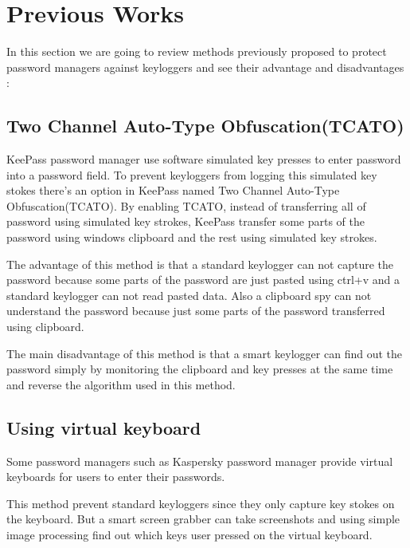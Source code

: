 \section{Previous Works}

In this section we are going to review methods previously proposed to protect password managers against keyloggers and see their advantage and disadvantages : 

\subsection{Two Channel Auto-Type Obfuscation(TCATO)}

KeePass password manager use software simulated key presses to enter password into a password field. To prevent keyloggers from logging this simulated key stokes there's an option in KeePass named Two Channel Auto-Type Obfuscation(TCATO). By enabling TCATO, instead of transferring all of password using simulated key strokes, KeePass transfer some parts of the password using windows clipboard and the rest using simulated key strokes.

The advantage of this method is that a standard keylogger can not capture the password because some parts of the password are just pasted using ctrl+v and a standard keylogger can not read pasted data. Also a clipboard spy can not understand the password because just some parts of the password transferred using clipboard. 

The main disadvantage of this method is that a smart keylogger can find out the password simply by monitoring the clipboard and key presses at the same time and reverse the algorithm used in this method.

\subsection{Using virtual keyboard}

Some password managers such as Kaspersky password manager provide virtual keyboards for users to enter their passwords. 

This method prevent standard keyloggers since they only capture key stokes on the keyboard. But a smart screen grabber can take screenshots and using simple image processing find out which keys user pressed on the virtual keyboard.
